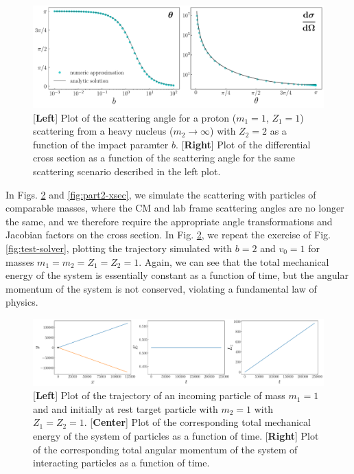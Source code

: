 \begin{figure}[h!tb]
    \centering
    \includegraphics[width=\textwidth]{part1-xsec.pdf}
    \caption{[\textbf{Left}] Plot of the scattering angle for a proton ($m_1 = 1$, $Z_1 = 1$) scattering from a heavy nucleus ($m_2 \rightarrow \infty$) with $Z_2 = 2$ as a function of the impact paramter $b$. [\textbf{Right}] Plot of the differential cross section as a function of the scattering angle for the same scattering scenario described in the left plot.}
    \label{fig:part1-xsec}
\end{figure}

In Figs. \ref{fig:test-solver2} and \ref{fig:part2-xsec}, we simulate the scattering with particles of comparable masses, where the CM and lab frame scattering angles are no longer the same, and we therefore require the appropriate angle transformations and Jacobian factors on the cross section.
In Fig. \ref{fig:test-solver2}, we repeat the exercise of Fig. \ref{fig:test-solver}, plotting the trajectory simulated with $b = 2$ and $v_0 = 1$ for masses $m_1 = m_2 = Z_1 = Z_2 = 1$.
Again, we can see that the total mechanical energy of the system is essentially constant as a function of time, but the angular momentum of the system is not conserved, violating a fundamental law of physics.


\begin{figure}[h!tb]
    \centering
    \includegraphics[width=\textwidth]{test_solver2.pdf}
    \caption{[\textbf{Left}] Plot of the trajectory of an incoming particle of mass $m_1 = 1$ and and initially at rest target particle with $m_2 = 1$ with $Z_1 = Z_2 = 1$. [\textbf{Center}] Plot of the corresponding total mechanical energy of the system of particles as a function of time. [\textbf{Right}] Plot of the corresponding total angular momentum of the system of interacting particles as a function of time.}
    \label{fig:test-solver2}
\end{figure}


